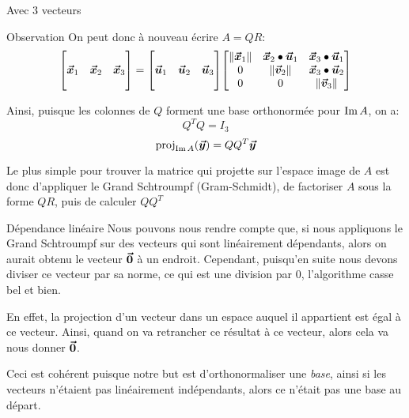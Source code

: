 \documentclass[a4paper]{article}
\begin{document}
\begin{parag}{Avec 3 vecteurs}
\begin{subparag}{Observation}
        On peut donc à nouveau écrire $A = QR$: 
        \[\begin{bmatrix}  &  &  \\ \bvec{x}_1 & \bvec{x}_2 & \bvec{x}_3 \\  &  &  \end{bmatrix} = \begin{bmatrix}  &  &  \\ \bvec{u}_1 & \bvec{u}_2 & \bvec{u}_3 \\  &  &  \end{bmatrix} \begin{bmatrix} \left\|\bvec{x}_1\right\| & \bvec{x}_2 \dotprod \bvec{u}_1 & \bvec{x}_3 \dotprod \bvec{u}_1 \\ 0 & \left\|\bvec{v}_2\right\| & \bvec{x}_3 \dotprod \bvec{u}_2 \\ 0 & 0 & \left\|\bvec{v}_3\right\| \end{bmatrix} \]
        
        Ainsi, puisque les colonnes de $Q$ forment une base orthonormée pour $\operatorname{Im} A$, on a: 
        \[Q^T Q = I_3\]
        \[\proj_{\im A}\left(\bvec{y}\right) = QQ^T \bvec{y}\]

        Le plus simple pour trouver la matrice qui projette sur l'espace image de $A$ est donc d'appliquer le Grand Schtroumpf (Gram-Schmidt), de factoriser $A$ sous la forme $QR$, puis de calculer $QQ^T$
    \end{subparag}
\end{parag}

\begin{parag}{Dépendance linéaire}
    Nous pouvons nous rendre compte que, si nous appliquons le Grand Schtroumpf sur des vecteurs qui sont linéairement dépendants, alors on aurait obtenu le vecteur $\bm{\protect\vec{0}}$ à un endroit. Cependant, puisqu'en suite nous devons diviser ce vecteur par sa norme, ce qui est une division par 0, l'algorithme casse bel et bien.

    En effet, la projection d'un vecteur dans un espace auquel il appartient est égal à ce vecteur. Ainsi, quand on va retrancher ce résultat à ce vecteur, alors cela va nous donner $\bm{\protect\vec{0}}$.

    Ceci est cohérent puisque notre but est d'orthonormaliser une \textit{base}, ainsi si les vecteurs n'étaient pas linéairement indépendants, alors ce n'était pas une base au départ.

\end{parag}
\end{document}
